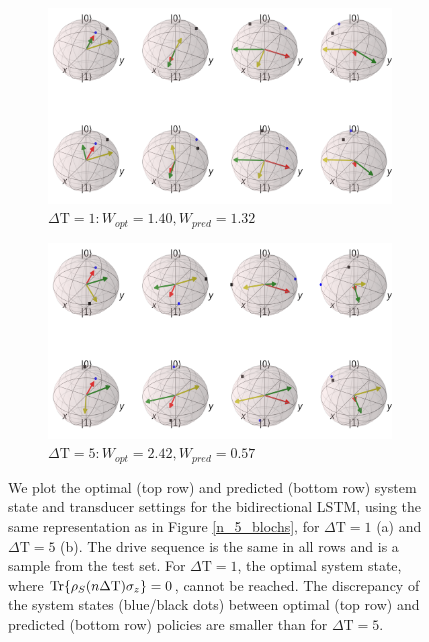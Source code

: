 \newpage

\begin{figure}[H]
	\centering
	\begin{subfigure}{0.85\textwidth}
		\centering
		\includegraphics[width=\textwidth]{img/bloch_comp_1_crop_sphere}
		\caption{$\Delta \mathrm{T} = 1: W_{opt} = 1.40, W_{pred} = 1.32$}
		\label{}
	\end{subfigure}
	\begin{subfigure}{0.85\textwidth}
		\centering
		\includegraphics[width=\textwidth]{img/bloch_comp_5_crop_sphere}
		\caption{$\Delta \mathrm{T} = 5: W_{opt} = 2.42, W_{pred} = 0.57$}
		\label{}
	\end{subfigure}
	\caption{We plot the optimal (top row) and predicted (bottom row) system state and transducer settings for the bidirectional LSTM, using the same representation as in Figure \ref{n_5_blochs}, for $\Delta \mathrm{T} = 1$ (a) and $\Delta \mathrm{T} = 5$ (b). The drive sequence is the same in all rows and is a sample from the test set. For $\Delta \mathrm{T} = 1$, the optimal system state, where $\Tr{\rho_S(n \Delta \mathrm{T}) \sigma_z} = 0$, cannot be reached. The discrepancy of the system states (blue/black dots) between optimal (top row) and predicted (bottom row) policies are smaller than for $\Delta \mathrm{T} = 5$.}
	\label{blochsdt15}
\end{figure}

